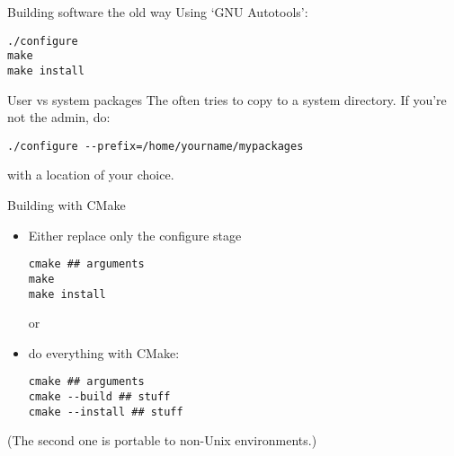 
\lstset{language=bash}

\begin{numberedframe}{Building software the old way}
  Using `GNU Autotools':
\begin{verbatim}
./configure
make
make install
\end{verbatim}
\end{numberedframe}

\begin{numberedframe}{User vs system packages}
  The  often tries to copy
  to a system directory. If you're not the admin, do:
\begin{verbatim}
./configure --prefix=/home/yourname/mypackages
\end{verbatim}
with a location of your choice.
\end{numberedframe}

\begin{numberedframe}{Building with CMake}
  \begin{itemize}
  \item Either replace only the configure stage
\begin{lstlisting}
cmake ## arguments
make
make install
\end{lstlisting}
or
  \item do everything with CMake:
\begin{lstlisting}
cmake ## arguments
cmake --build ## stuff
cmake --install ## stuff
\end{lstlisting}
  \end{itemize}
(The second one is portable to non-Unix environments.)
\end{numberedframe}

